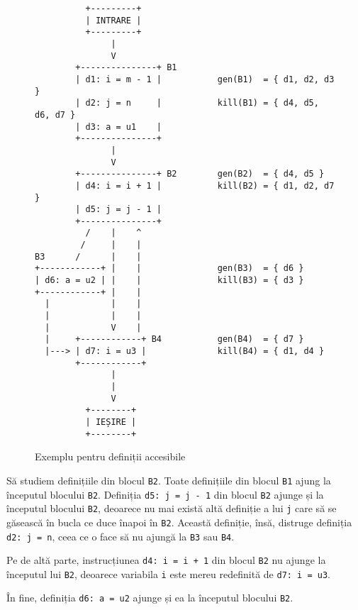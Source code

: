 \begin{figure}[!htbp]
  \centering
  \small
\begin{BVerbatim}
          +---------+
          | INTRARE |
          +---------+
               |
               V
        +---------------+ B1        
        | d1: i = m - 1 |           gen(B1)  = { d1, d2, d3 }
        | d2: j = n     |           kill(B1) = { d4, d5, d6, d7 }
        | d3: a = u1    |
        +---------------+
               |
               V
        +---------------+ B2        gen(B2)  = { d4, d5 }
        | d4: i = i + 1 |           kill(B2) = { d1, d2, d7 }
        | d5: j = j - 1 |
        +---------------+
          /    |    ^
         /     |    |
B3      /      |    |
+------------+ |    |               gen(B3)  = { d6 }
| d6: a = u2 | |    |               kill(B3) = { d3 }
+------------+ |    |
  |            |    |
  |            |    |
  |            V    |
  |     +------------+ B4           gen(B4)  = { d7 }
  |---> | d7: i = u3 |              kill(B4) = { d1, d4 }
        +------------+
               |
               |
               V
          +--------+
          | IEȘIRE |
          +--------+
\end{BVerbatim}
  \caption{Exemplu pentru definiții accesibile}
  \label{fig:rdef-ex1}
\end{figure}

Să studiem definițiile din blocul \texttt{B2}. Toate definițiile din blocul
\texttt{B1} ajung la începutul blocului \texttt{B2}. Definiția
\texttt{d5:\!\!\!\! j = j - 1} din blocul \texttt{B2} ajunge și la începutul blocului
\texttt{B2}, deoarece nu mai există altă definiție a lui \texttt{j} care să
se găsească în bucla ce duce înapoi în \texttt{B2}. Această definiție, însă,
distruge definiția \texttt{d2:\!\!\!\! j = n}, ceea ce o face să nu ajungă la
\texttt{B3} sau \texttt{B4}.

Pe de altă parte, instrucțiunea \texttt{d4:\!\!\!\! i = i + 1} din blocul \texttt{B2}
nu ajunge la începutul lui \texttt{B2}, deoarece variabila \texttt{i} este
mereu redefinită de \texttt{d7:\!\!\!\! i = u3}.

În fine, definiția \texttt{d6:\!\!\!\! a = u2} ajunge și ea la începutul blocului
\texttt{B2}.

